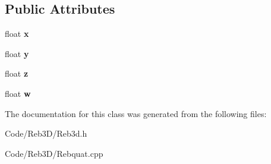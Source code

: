 \subsection*{Public Attributes}
\begin{DoxyCompactItemize}
\item 
float {\bfseries x}\hypertarget{class_reb_quat_a403f151e7dcd38272ac4a02da9684a8d}{}\label{class_reb_quat_a403f151e7dcd38272ac4a02da9684a8d}

\item 
float {\bfseries y}\hypertarget{class_reb_quat_afc3a9dc72d3ad2655ad45ca3a04b454c}{}\label{class_reb_quat_afc3a9dc72d3ad2655ad45ca3a04b454c}

\item 
float {\bfseries z}\hypertarget{class_reb_quat_af3aa81559de78cb720db226a677fe805}{}\label{class_reb_quat_af3aa81559de78cb720db226a677fe805}

\item 
float {\bfseries w}\hypertarget{class_reb_quat_acdd6b2694744ff9c160c5033a18f1422}{}\label{class_reb_quat_acdd6b2694744ff9c160c5033a18f1422}

\end{DoxyCompactItemize}


The documentation for this class was generated from the following files\+:\begin{DoxyCompactItemize}
\item 
Code/\+Reb3\+D/Reb3d.\+h\item 
Code/\+Reb3\+D/Rebquat.\+cpp\end{DoxyCompactItemize}
